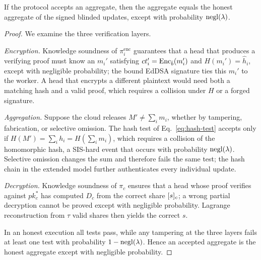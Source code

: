 \begin{theorem}
\label{thm:verifiability}
If the protocol accepts an aggregate, then the aggregate equals the honest aggregate of the signed blinded updates, except with probability $\operatorname{negl}(\lambda)$.
\end{theorem}
\begin{proof}
We examine the three verification layers.

\emph{Encryption.} Knowledge soundness of $\pi_i^{\mathrm{enc}}$ guarantees that a head that produces a verifying proof must know an $m_i'$ satisfying $ct_i'=\operatorname{Enc}_{\bar b}(m_i')$ and $H(m_i')=\hat h_i$, except with negligible probability; the bound EdDSA signature ties this $m_i'$ to the worker. A head that encrypts a different plaintext would need both a matching hash and a valid proof, which requires a collision under $H$ or a forged signature.

\emph{Aggregation.} Suppose the cloud releases $M'\neq\sum_i m_i$, whether by tampering, fabrication, or selective omission. The hash test of Eq.~\eqref{eq:hash-test} accepts only if $H(M')=\sum_i h_i=H(\sum_i m_i)$, which requires a collision of the homomorphic hash, a SIS-hard event that occurs with probability $\operatorname{negl}(\lambda)$. Selective omission changes the sum and therefore fails the same test; the hash chain in the extended model further authenticates every individual update.

\emph{Decryption.} Knowledge soundness of $\pi_c$ ensures that a head whose proof verifies against $pk_c^*$ has computed $D_c$ from the correct share $[s]_{c}$; a wrong partial decryption cannot be proved except with negligible probability. Lagrange reconstruction from $\tau$ valid shares then yields the correct $s$.

In an honest execution all tests pass, while any tampering at the three layers fails at least one test with probability $1-\operatorname{negl}(\lambda)$. Hence an accepted aggregate is the honest aggregate except with negligible probability.
\end{proof}

